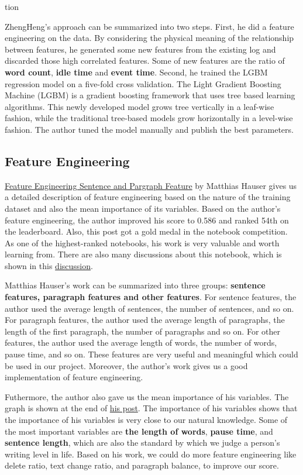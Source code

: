 tion\documentclass[8pt]{article}
\begin{document}
ZhengHeng's approach can be summarized into two steps. First, he did a feature engineering on the data. 
By considering the physical meaning of the relationship between features, he generated some new features from 
the existing log and discarded those high correlated features. Some of new features are the ratio of 
\textbf{word count}, \textbf{idle time} and \textbf{event time}. Second, he trained the LGBM regression model
on a five-fold cross validation. The Light Gradient Boosting Machine (LGBM) is a gradient boosting framework
that uses tree based learning algorithms. 
This newly developed model grows tree vertically in a leaf-wise fashion, while the traditional tree-based models
grow horizontally in a level-wise fashion. The author tuned the model manually and publish the best parameters. 

\subsection{Feature Engineering}
\href{https://www.kaggle.com/code/hiarsl/feature-engineering-sentence-paragraph-features}{Feature Engineering Sentence and Pargraph Feature} by Matthias Hauser
gives us a detailed description of feature engineering based on the nature of the training dataset and also the mean importance of its variables. Based on the author's feature engineering,
the author improved his score to 0.586 and ranked 54th on the leaderboard. Also, this post got a gold medal in the notebook competition. As one of the highest-ranked notebooks, 
his work is very valuable and worth learning from. There are also many discussions about this notebook, which is shown in this \href{https://www.kaggle.com/code/hiarsl/feature-engineering-sentence-paragraph-features/comments}{discussion}.

Matthias Hauser's work can be summarized into three groups: \textbf{sentence features, paragraph features and other features}. 
For sentence features, the author used the average length of sentences, the number of sentences, and so on. 
For paragraph features, the author used the average length of paragraphs, the length of the first paragraph, the number of paragraphs and so on.
For other features, the author used the average length of words, the number of words, pause time, and so on.
These features are very useful and meaningful which could be used in our project. Moreover, the author's work gives us a good implementation of feature engineering.

Futhermore, the author also gave us the mean importance of his variables. The graph is shown at the end of \href{https://www.kaggle.com/code/hiarsl/feature-engineering-sentence-paragraph-features/notebook}{his post}.
The importance of his variables shows that the importance of his variables is very close to our natural knowledge. Some of the most important variables are \textbf{the length of words}, \textbf{pause time}, and \textbf{sentence length}, which are also the standard by which we judge a person’s writing level in life.
Based on his work, we could do more feature engineering like delete ratio, text change ratio, and paragraph balance, to improve our score.
\end{document}
